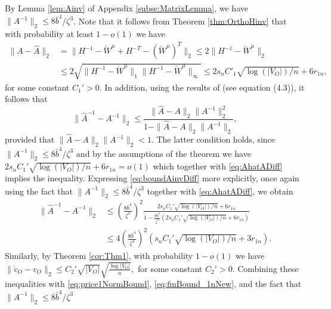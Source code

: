 \documentclass[opre,nonblindrev]{informs3} %
\begin{document}
\begin{APPENDIX}{}
   {By Lemma \ref{lem:Ainv}} of Appendix \ref{subse:MatrixLemma}, we have
   $ \|A^{-1}\|_2 \leq 8\bar{b}^4/\zeta^3$.	
   Note that it follows from Theorem \ref{thm:OrthoHinv} that with probability at least $1-o(1)$ we have
   \begin{equation}\label{eq:AhatADiff}
   \begin{aligned}
   \|A-\hat{A}\|_2 &=\|H^{-1}-\check{W}^\mu +H^{-T}-(\check{W}^\mu)^T\|_2 \leq
   2\|H^{-1}-\check{W}^\mu \|_2  \\
   &\leq  2  \sqrt{\|H^{-1}-\check{W}^\mu \|_1  \|H^{-1}-\check{W}^\mu \|_\infty}
   \leq
   2s_nC'_1 \sqrt{\log(|V_O|)/n} + 6 r_{1n},
   \end{aligned}
   \end{equation}
   for some constant $C_1'>0$.
   In addition,
   using the results of \citet{dwyer1953errors} (see equation (4.3)), it follows that
   \begin{equation}\label{eq:boundAinvDiff}
   \|\hat{A}^{-1} - A^{-1}\|_2 \leq \frac{\|\hat{A} -A\|_2 \|{A}^{-1} \|_2^2}{1- \|\hat{A} -A\|_2 \|A^{-1}\|_2},
   \end{equation}
   provided that $\|\hat{A} -A\|_2 \|A^{-1}\|_2 <1$.
   The latter condition holds, since
   $ \|A^{-1}\|_2 \leq 8\bar{b}^4/\zeta^3$ and
   by the assumptions of the theorem we have
   $2s_nC_1' \sqrt{\log(|V_O|)/n} + 6 r_{1n}=o(1)$
   which together with  \eqref{eq:AhatADiff} implies the inequality.
   Expressing \eqref{eq:boundAinvDiff} more explicitly, once again  using the fact that
   $ \|A^{-1}\|_2 \leq 8\bar{b}^4/\zeta^3$ together with
   \eqref{eq:AhatADiff}, we obtain
   \begin{equation}\label{eq:finBound_1nNew}
   \begin{aligned}
   \|\hat{A}^{-1} - A^{-1}\|_2 &\leq
   \left(\frac{8\bar{b}^4}{\zeta^3}\right)^2
   \frac{      2s_nC_1' \sqrt{\log(|V_O|)/n} + 6 r_{1n}}{1- \frac{8\bar{b}^4}{\zeta^3}(2s_nC_1' \sqrt{\log(|V_O|)/n} + 6 r_{1n})}\\
   &\leq
   4\left(\frac{8\bar{b}^4}{\zeta^3}\right)^2
   \left(     s_nC_1' \sqrt{\log(|V_O|)/n} + 3 r_{1n}\right).
   \end{aligned}
   \end{equation}
   Similarly, by   Theorem
   \ref{cor:Thm1},
    with probability $1-o(1)$
   we have
   $\|\check{{v}}_O-{{v}}_O \|_2 \leq C_2'  \sqrt{|V_O|}\sqrt{\frac{\log |V_O|}{n}},$
   for some constant $C_2'>0$.
   Combining these inequalities
   with \eqref{eq:price1NormBound},
   \eqref{eq:finBound_1nNew}, and the fact that
   $ \|A^{-1}\|_2 \leq 8\bar{b}^4/\zeta^3$

\end{APPENDIX}
\end{document}
